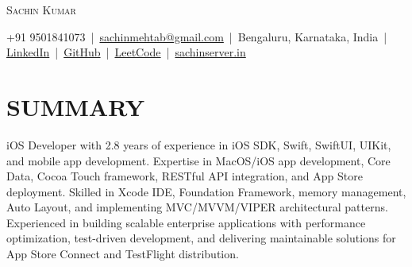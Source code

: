 \documentclass[letterpaper,11pt]{article}
\begin{document}
\begin{center}
{\Huge \scshape Sachin Kumar} \\ \vspace{6pt}

\small 
+91 9501841073 \,|\, 
\href{mailto:sachinmehtab@gmail.com}{sachinmehtab@gmail.com} \,|\, 
Bengaluru, Karnataka, India \,|\, 
\href{https://linkedin.com/in/sachinkumar6174}{LinkedIn} \,|\, 
\href{https://github.com/sachin6174}{GitHub} \,|\, 
\href{https://leetcode.com/u/sachinkumar6174/}{LeetCode} \,|\, 
\href{https://www.sachinserver.in}{sachinserver.in}
\end{center}

\vspace{-2pt}

\section{SUMMARY}
iOS Developer with 2.8 years of experience in iOS SDK, Swift, SwiftUI, UIKit, and mobile app development. Expertise in MacOS/iOS app development, Core Data, Cocoa Touch framework, RESTful API integration, and App Store deployment. Skilled in Xcode IDE, Foundation Framework, memory management, Auto Layout, and implementing MVC/MVVM/VIPER architectural patterns. Experienced in building scalable enterprise applications with performance optimization, test-driven development, and delivering maintainable solutions for App Store Connect and TestFlight distribution.

\end{document}
